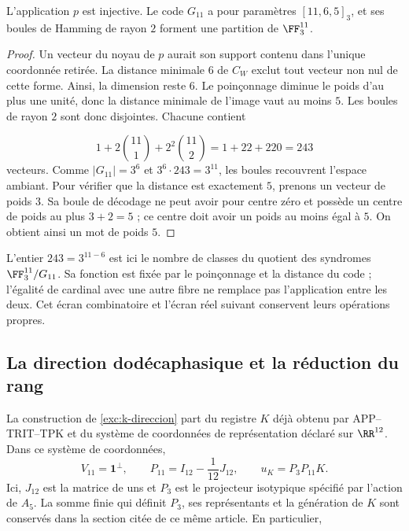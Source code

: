 \begin{proposition}
\label{iv:prop:codigo-once}
L’application \(p\) est injective. Le code \(G_{11}\) a pour
paramètres \([11,6,5]_3\), et ses boules de Hamming de rayon
\(2\) forment une partition de \(\FF_3^{11}\).
\end{proposition}
\begin{proof}
Un vecteur du noyau de \(p\) aurait son support contenu dans
l’unique coordonnée retirée. La distance minimale \(6\)
de \(C_W\) exclut tout vecteur non nul de cette forme.
Ainsi, la dimension reste \(6\). Le poinçonnage diminue
le poids d’au plus une unité, donc la distance minimale
de l’image vaut au moins \(5\). Les boules de rayon \(2\)
sont donc disjointes. Chacune contient

\[
 1+2\binom{11}{1}+2^2\binom{11}{2}
 =1+22+220=243
\]
vecteurs. Comme \(|G_{11}|=3^6\) et
\(3^6\cdot243=3^{11}\), les boules recouvrent l’espace ambiant.
Pour vérifier que la distance est exactement \(5\),
prenons un vecteur de poids \(3\). Sa boule de décodage
ne peut avoir pour centre zéro et possède un centre de poids au
plus \(3+2=5\) ; ce centre doit avoir un poids au moins égal à
\(5\). On obtient ainsi un mot de poids \(5\).
\end{proof}

L’entier \(243=3^{11-6}\) est ici le nombre de classes
du quotient des syndromes \(\FF_3^{11}/G_{11}\). Sa
fonction est fixée par le poinçonnage et la distance du
code ; l’égalité de cardinal avec une autre fibre ne remplace pas
l’application entre les deux. Cet écran combinatoire et
l’écran réel suivant conservent leurs opérations propres.

\subsection{La direction dodécaphasique et la réduction du rang}

La construction de \ref{exc:k-direccion} part du registre
\(K\) déjà obtenu par APP--TRIT--TPK et du système de coordonnées de
représentation déclaré sur \(\RR^{12}\). Dans ce système de coordonnées,
\begin{equation}
 V_{11}=\mathbf1^\perp,\qquad
 P_{11}=I_{12}-\frac1{12}J_{12},\qquad
 u_K=P_3P_{11}K.
 \label{iv:eq:p11-uk}
\end{equation}
Ici, \(J_{12}\) est la matrice de uns et \(P_3\) est le
projecteur isotypique spécifié par l’action de \(A_5\).
La somme finie qui définit \(P_3\), ses représentants et la
génération de \(K\) sont conservés dans la section citée de
ce même article. En particulier,

